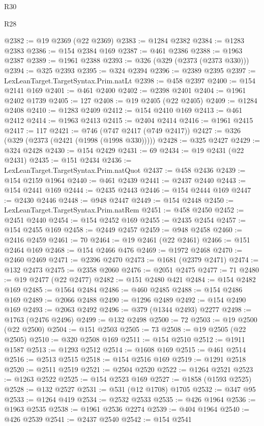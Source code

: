 \begin{lexlean}{R30}
\begin{lexlean}{R28}
\begin{coremodule}
{{{{{{{{{{{{{{{{{{{{{{{{{{{{{{{{{{{{{{{{{{{{{{{{{{{{{{{{{{{{{{{{{{{{{{{{{{{{{{{{{{{{{{{{{{{{{{{{{{{{{{{{{{{{{{{{{{{{{{{{{{{{{{{{{{{{{{{{{{{{{{{@2382 := @19 @2369 (@22 @2369)
@2383 := @1284 @2382
@2384 := @1283 @2383
@2386 := @154 @2384 @169
@2387 := @461 @2386
@2388 := @1963 @2387
@2389 := @1961 @2388
@2393 := @326 (@329 (@2373 (@2373 @330)))
@2394 := @325 @2393
@2395 := @324 @2394
@2396 := @2389 @2395
@2397 := LexLeanTarget.TargetSyntax.Prim.natLt
@2398 := @458 @2397
@2400 := @154 @2141 @169
@2401 := @461 @2400
@2402 := @2398 @2401
@2404 := @1961 @2402 @1739
@2405 := 127
@2408 := @19 @2405 (@22 @2405)
@2409 := @1284 @2408
@2410 := @1283 @2409
@2412 := @154 @2410 @169
@2413 := @461 @2412
@2414 := @1963 @2413
@2415 := @2404 @2414
@2416 := @1961 @2415
@2417 := 117
@2421 := @746 (@747 @2417 (@749 @2417))
@2427 := @326 (@329 (@2373 (@2421 (@1998 (@1998 @330)))))
@2428 := @325 @2427
@2429 := @324 @2428
@2430 := @154 @2429
@2431 := 69
@2434 := @19 @2431 (@22 @2431)
@2435 := @151 @2434
@2436 := LexLeanTarget.TargetSyntax.Prim.natQuot
@2437 := @458 @2436
@2439 := @154 @2159 @1964
@2440 := @461 @2439
@2441 := @2437 @2440
@2443 := @154 @2441 @169
@2444 := @2435 @2443
@2446 := @154 @2444 @169
@2447 := @2430 @2446
@2448 := @948 @2447
@2449 := @154 @2448
@2450 := LexLeanTarget.TargetSyntax.Prim.natRem
@2451 := @458 @2450
@2452 := @2451 @2440
@2454 := @154 @2452 @169
@2455 := @2435 @2454
@2457 := @154 @2455 @169
@2458 := @2449 @2457
@2459 := @948 @2458
@2460 := @2416 @2459
@2461 := 70
@2464 := @19 @2461 (@22 @2461)
@2466 := @151 @2464 @169
@2468 := @154 @2466 @476
@2469 := @1972 @2468
@2470 := @2460 @2469
@2471 := @2396 @2470
@2473 := @1681 (@2379 @2471)
@2474 := @132 @2473
@2475 := @2358 @2060
@2476 := @2051 @2475
@2477 := 71
@2480 := @19 @2477 (@22 @2477)
@2482 := @151 @2480 @421
@2484 := @154 @2482 @169
@2485 := @1564 @2484
@2486 := @460 @2485
@2488 := @154 @2486 @169
@2489 := @2066 @2488
@2490 := @1296 @2489
@2492 := @154 @2490 @169
@2493 := @2063 @2492
@2496 := @379 (@1344 @2493) @2277
@2498 := @1763 (@2476 @2496)
@2499 := @132 @2498
@2500 := 72
@2503 := @19 @2500 (@22 @2500)
@2504 := @151 @2503
@2505 := 73
@2508 := @19 @2505 (@22 @2505)
@2510 := @320 @2508 @169
@2511 := @154 @2510
@2512 := @1911 @1587
@2513 := @1293 @2512
@2514 := @1608 @169
@2515 := @461 @2514
@2516 := @2513 @2515
@2518 := @154 @2516 @169
@2519 := @1291 @2518
@2520 := @2511 @2519
@2521 := @2504 @2520
@2522 := @1264 @2521
@2523 := @1263 @2522
@2525 := @154 @2523 @169
@2527 := @1858 (@1593 @2525)
@2528 := @132 @2527
@2531 := @531 (@12 @1708) @1705
@2532 := @347 @95
@2533 := @1264 @419
@2534 := @2532 @2533
@2535 := @426 @1964
@2536 := @1963 @2535
@2538 := @1961 @2536 @2274
@2539 := @404 @1964
@2540 := @426 @2539
@2541 := @2437 @2540
@2542 := @154 @2541
}}}}}}}}}}}}}}}}}}}}}}}}}}}}}}}}}}}}}}}}}}}}}}}}}}}}}}}}}}}}}}}}}}}}}}}}}}}}}}}}}}}}}}}}}}}}}}}}}}}}}}}}}}}}}}}}}}}}}}}}}}}}}}}}}}}}}}}}}}}}}}}
\end{coremodule}
\end{lexlean}
\end{lexlean}
